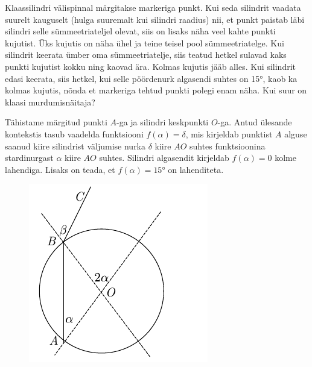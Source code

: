 
Klaassilindri välispinnal märgitakse markeriga punkt. Kui seda silindrit vaadata suurelt kauguselt (hulga suuremalt kui silindri raadius) nii, et punkt paistab läbi silindri selle sümmeetriateljel olevat, siis on lisaks näha veel kahte punkti kujutist. Üks kujutis on näha ühel ja teine teisel pool sümmeetriatelge. Kui silindrit keerata ümber oma sümmeetriatelje, siis teatud hetkel sulavad kaks punkti kujutist kokku ning kaovad ära. Kolmas kujutis jääb alles. Kui silindrit edasi keerata, siis hetkel, kui selle pöördenurk algasendi suhtes on \ang{15}, kaob ka kolmas kujutis, nõnda et markeriga tehtud punkti polegi enam näha. Kui suur on klaasi murdumisnäitaja?

\hint
Tähistame märgitud punkti $A$-ga ja silindri keskpunkti $O$-ga. Antud ülesande kontekstis tasub vaadelda funktsiooni $f(\alpha) = \delta$, mis kirjeldab punktist $A$ alguse saanud kiire silindrist väljumise nurka $\delta$ kiire $AO$ suhtes funktsioonina stardinurgast $\alpha$ kiire $AO$ suhtes. Silindri algasendit kirjeldab $f(\alpha) = 0$ kolme lahendiga. Lisaks on teada, et $f(\alpha) = \ang{15}$ on lahenditeta.

\solu
\begin{figure}%
\includegraphics[trim = 0mm 0mm 12mm 0mm, clip, width=1\linewidth]{2014-v3g-10-silinder}
\end{figure}

